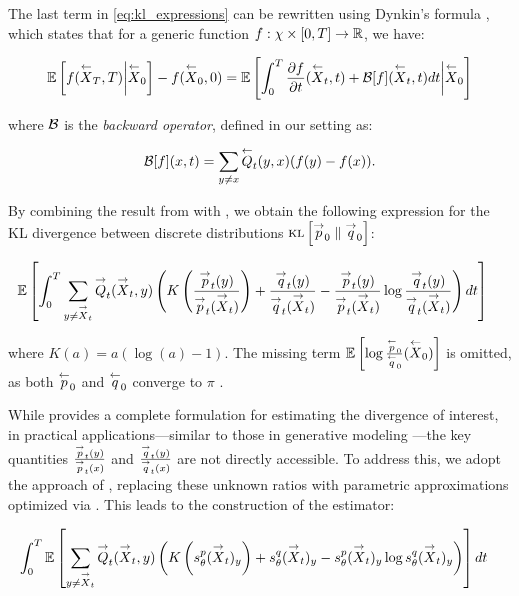 The last term in \eqref{eq:kl_expressions} can be rewritten using Dynkin's formula \cite{hanson2007applied}, which states that for a generic function \( f:\chi\times[0,T]\to\mathbb{R} \), we have:

\begin{equation}\label{eq:dynkin}
    \mathbb{E}\left[f(\overset{\leftarrow}{X}_T,T)\bigg|\overset{\leftarrow}{X}_0\right]- f(\overset{\leftarrow}{X}_0,0)=\mathbb{E}\left[\int_0^T\frac{\partial f}{\partial t}(\overset{\leftarrow}{X}_t,t)+\mathcal{B}[f](\overset{\leftarrow}{X}_t,t)dt\bigg|\overset{\leftarrow}{X}_0\right]
\end{equation}

where \( \mathcal{B} \) is the \textit{backward operator}, defined in our setting as:

\begin{equation}
    \mathcal{B}[f](x,t) = \sum_{y\neq x}\overset{\leftarrow}{Q}_t(y,x)(f(y)-f(x)).
\end{equation}

By combining the result from  with , we obtain the following expression for the KL divergence between discrete distributions \( \textsc{kl}\left[\overset{\rightarrow}{p}_0\;\|\;\overset{\rightarrow}{q}_0\right] \):

\begin{align}\label{eq:infosedd}
&\mathbb{E}\left[\int_0^T\sum_{y\neq \overset{\rightarrow}{X}_t} \overset{\rightarrow}{Q}_{t}(\overset{\rightarrow}{X}_t,y)\left(K\left(\frac{\overset{\rightarrow}{p}_t(y)}{\overset{\rightarrow}{p}_t(\overset{\rightarrow}{X}_t)}\right)+\frac{\overset{\rightarrow}{q}_t(y)}{\overset{\rightarrow}{q}_t(\overset{\rightarrow}{X}_t)}-\frac{\overset{\rightarrow}{p}_t(y)}{\overset{\rightarrow}{p}_t(\overset{\rightarrow}{X}_t)}\log\frac{\overset{\rightarrow}{q}_t(y)}{\overset{\rightarrow}{q}_t(\overset{\rightarrow}{X}_t)}\right)dt\right]
\end{align}

where \( K(a)=a(\log(a)-1) \). The missing term \( \mathbb{E}\left[\log{\frac{\overset{\leftarrow}{p}_0}{\overset{\leftarrow}{q}_0}}(\overset{\leftarrow}{X}_0)\right] \) is omitted, as both \( \overset{\leftarrow}{p}_0 \) and \( \overset{\leftarrow}{q}_0 \) converge to \( \pi \) \citep{lou2024discrete}.

While  provides a complete formulation for estimating the divergence of interest, in practical applications—similar to those in generative modeling \citep{lou2024discrete, ren2024discrete, holderrieth2024generator}—the key quantities \( \frac{\overset{\rightarrow}{p}_{t}(y)}{\overset{\rightarrow}{p}_{t}(x)} \) and \( \frac{\overset{\rightarrow}{q}_{t}(y)}{\overset{\rightarrow}{q}_{t}(x)} \) are not directly accessible. To address this, we adopt the approach of \citet{lou2024discrete}, replacing these unknown ratios with parametric approximations optimized via . This leads to the construction of the estimator:

\begin{align}\label{eq:infosedd-param} 
&\int_0^T\mathbb{E}\left[\sum_{y\neq \overset{\rightarrow}{X}_{t}} \overset{\rightarrow}{Q}_{t}(\overset{\rightarrow}{X}_{t},y)\left(K\left(s^p_\theta(\overset{\rightarrow}{X}_{t})_y\right)+s^q_\theta(\overset{\rightarrow}{X}_{t})_y-s^p_\theta(\overset{\rightarrow}{X}_{t})_y\log s^q_\theta(\overset{\rightarrow}{X}_{t})_y\right)\right] dt
\end{align}

